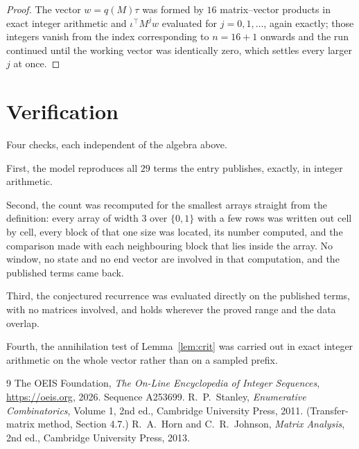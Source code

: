 \documentclass[11pt,a4paper]{article}
\theoremstyle{plain}
\theoremstyle{definition}
\begin{document}
\begin{proof}
The vector $w=q(M)\tau$ was formed by $16$ matrix--vector products in exact integer
arithmetic and $\iota^{\!\top}M^{j}w$ evaluated for $j=0,1,\dots$, again exactly; those
integers vanish from the index corresponding to $n=16+1$ onwards and the run continued
until the working vector was identically zero, which settles every larger $j$ at once.
\end{proof}

\section{Verification}

Four checks, each independent of the algebra above.

First, the model reproduces all $29$ terms the entry publishes, exactly, in integer
arithmetic.

Second, the count was recomputed for the smallest arrays straight from the definition: every
array of width $3$ over $\{0,1\}$ with a few rows was written out cell by cell, every block of
that one size was located, its number computed, and the comparison made with each neighbouring block
that lies inside the array. No window, no state and no end vector are involved in that
computation, and the published terms came back.

Third, the conjectured recurrence was evaluated directly on the published terms, with no
matrices involved, and holds wherever the proved range and the data overlap.

Fourth, the annihilation test of Lemma~\ref{lem:crit} was carried out in exact integer
arithmetic on the whole vector rather than on a sampled prefix.

\begin{thebibliography}{9}
 The OEIS Foundation, \emph{The On-Line Encyclopedia of Integer
Sequences}, \url{https://oeis.org}, 2026. Sequence A253699.
 R.~P.~Stanley, \emph{Enumerative Combinatorics}, Volume 1, 2nd ed.,
Cambridge University Press, 2011. (Transfer-matrix method, Section 4.7.)
 R.~A.~Horn and C.~R.~Johnson, \emph{Matrix Analysis}, 2nd ed., Cambridge
University Press, 2013.
\end{thebibliography}
\end{document}

